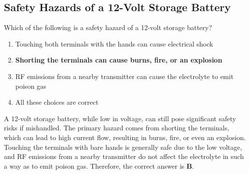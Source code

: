 \subsection{Safety Hazards of a 12-Volt Storage Battery}
\label{T0A01}

\begin{tcolorbox}[colback=gray!10!white,colframe=black!75!black,title=T0A01]
Which of the following is a safety hazard of a 12-volt storage battery?
\begin{enumerate}[noitemsep]
    \item Touching both terminals with the hands can cause electrical shock
    \item \textbf{Shorting the terminals can cause burns, fire, or an explosion}
    \item RF emissions from a nearby transmitter can cause the electrolyte to emit poison gas
    \item All these choices are correct
\end{enumerate}
\end{tcolorbox}

A 12-volt storage battery, while low in voltage, can still pose significant safety risks if mishandled. The primary hazard comes from shorting the terminals, which can lead to high current flow, resulting in burns, fire, or even an explosion. Touching the terminals with bare hands is generally safe due to the low voltage, and RF emissions from a nearby transmitter do not affect the electrolyte in such a way as to emit poison gas. Therefore, the correct answer is \textbf{B}.